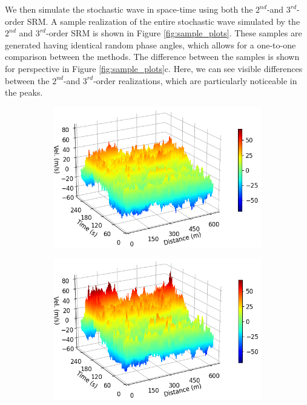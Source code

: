 \documentclass[preprint, review, 12pt]{elsarticle}
\begin{document}
We then simulate the stochastic wave in space-time using both the $2^{nd}$-and $3^{rd}$-order SRM. A sample realization of the entire stochastic wave simulated by the $2^{nd}$ and $3^{rd}$-order SRM is shown in Figure \ref{fig:sample_plots}. These samples are generated having identical random phase angles, which allows for a one-to-one comparison between the methods. The difference between the samples is shown for perspective in Figure \ref{fig:sample_plots}c. Here, we can see visible differences between the $2^{nd}$-and $3^{rd}$-order realizations, which are particularly noticeable in the peaks.
\begin{figure}[!ht]
\centering
\begin{subfigure}{0.49\textwidth}
  \includegraphics[width=0.8\linewidth]{plots/sample_SRM.png}
  \label{fig:sample_srm}
  \caption{}
 \end{subfigure}
 \begin{subfigure}{0.49\textwidth}
  \includegraphics[width=0.8\linewidth]{plots/sample_BSRM.png}
  \label{fig:sample_bsrm}
  \caption{}
 \end{subfigure}
  \begin{subfigure}{0.50\textwidth}

\end{subfigure}
\end{figure}
\end{document}
